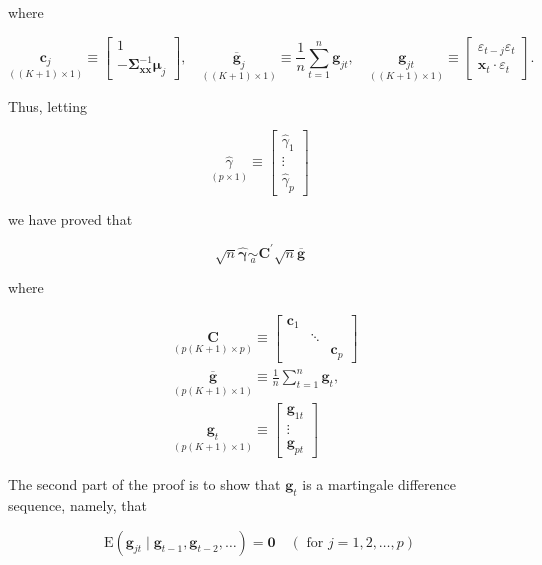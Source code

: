 \documentclass[10pt]{article}
\begin{document}
where

\[
\underset{((K+1) \times 1)}{\mathbf{c}_{j}} \equiv\left[\begin{array}{c}
1  \tag{2.B.1}\\
-\boldsymbol{\Sigma}_{\mathbf{x x}}^{-1} \boldsymbol{\mu}_{j}
\end{array}\right], \quad \underset{((K+1) \times 1)}{\overline{\mathbf{g}}_{j}} \equiv \frac{1}{n} \sum_{t=1}^{n} \mathbf{g}_{j t}, \quad \underset{((K+1) \times 1)}{\mathbf{g}_{j t}} \equiv\left[\begin{array}{l}
\varepsilon_{t-j} \varepsilon_{t} \\
\mathbf{x}_{t} \cdot \varepsilon_{t}
\end{array}\right] .
\]

Thus, letting

$$
\underset{(p \times 1)}{\hat{\gamma}} \equiv\left[\begin{array}{c}
\hat{\gamma}_{1} \\
\vdots \\
\hat{\gamma}_{p}
\end{array}\right]
$$

we have proved that

$$
\sqrt{n} \hat{\boldsymbol{\gamma}} \underset{a}{\sim} \mathbf{C}^{\prime} \sqrt{n} \overline{\mathbf{g}}
$$

where

$$
\begin{aligned}
& \underset{(p(K+1) \times p)}{\mathbf{C}} \equiv\left[\begin{array}{lll}
\mathbf{c}_{1} & & \\
& \ddots & \\
& & \mathbf{c}_{p}
\end{array}\right] \\
& \underset{(p(K+1) \times 1)}{\overline{\mathbf{g}}} \equiv \frac{1}{n} \sum_{t=1}^{n} \mathbf{g}_{t}, \\
& \underset{(p(K+1) \times 1)}{\mathbf{g}_{t}} \equiv\left[\begin{array}{c}
\mathbf{g}_{1 t} \\
\vdots \\
\mathbf{g}_{p t}
\end{array}\right]
\end{aligned}
$$

The second part of the proof is to show that $\mathbf{g}_{t}$ is a martingale difference sequence, namely, that

$$
\mathrm{E}\left(\mathbf{g}_{j t} \mid \mathbf{g}_{t-1}, \mathbf{g}_{t-2}, \ldots\right)=\mathbf{0} \quad(\text { for } j=1,2, \ldots, p)
$$
\end{document}
